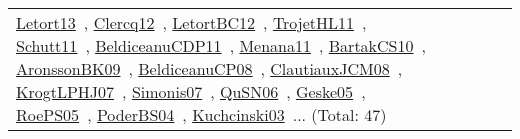 {\begin{longtable}{lp{3cm}>{\raggedright\arraybackslash}p{6cm}>{\raggedright\arraybackslash}p{6cm}>{\raggedright\arraybackslash}p{8cm}}
\href{../works/Letort13.pdf}{Letort13}~\cite{Letort13}, \href{../works/Clercq12.pdf}{Clercq12}~\cite{Clercq12}, \href{../works/LetortBC12.pdf}{LetortBC12}~\cite{LetortBC12}, \href{../works/TrojetHL11.pdf}{TrojetHL11}~\cite{TrojetHL11}, \href{../works/Schutt11.pdf}{Schutt11}~\cite{Schutt11}, \href{../works/BeldiceanuCDP11.pdf}{BeldiceanuCDP11}~\cite{BeldiceanuCDP11}, \href{../works/Menana11.pdf}{Menana11}~\cite{Menana11}, \href{../works/BartakCS10.pdf}{BartakCS10}~\cite{BartakCS10}, \href{../works/AronssonBK09.pdf}{AronssonBK09}~\cite{AronssonBK09}, \href{../works/BeldiceanuCP08.pdf}{BeldiceanuCP08}~\cite{BeldiceanuCP08}, \href{../works/ClautiauxJCM08.pdf}{ClautiauxJCM08}~\cite{ClautiauxJCM08}, \href{../works/KrogtLPHJ07.pdf}{KrogtLPHJ07}~\cite{KrogtLPHJ07}, \href{../works/Simonis07.pdf}{Simonis07}~\cite{Simonis07}, \href{../works/QuSN06.pdf}{QuSN06}~\cite{QuSN06}, \href{../works/Geske05.pdf}{Geske05}~\cite{Geske05}, \href{../works/RoePS05.pdf}{RoePS05}~\cite{RoePS05}, \href{../works/PoderBS04.pdf}{PoderBS04}~\cite{PoderBS04}, \href{../works/Kuchcinski03.pdf}{Kuchcinski03}~\cite{Kuchcinski03}... (Total: 47)\\

\end{longtable}}
